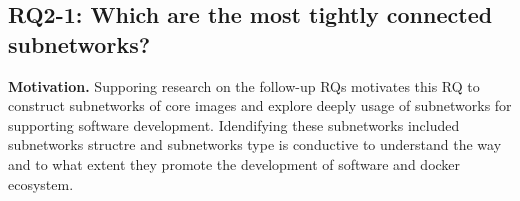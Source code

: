 \documentclass[sigconf]{acmart}
\begin{document}









\subsection{RQ2-1:  Which are the most tightly connected subnetworks?}\label{AA}


\noindent\textbf{Motivation. }Supporing research on the follow-up RQs motivates this RQ to construct subnetworks of core images and explore deeply usage of subnetworks for supporting software development. Idendifying these subnetworks included subnetworks structre and subnetworks type is conductive to understand the way and to what extent they promote the development of software and docker ecosystem. 


\end{document}
